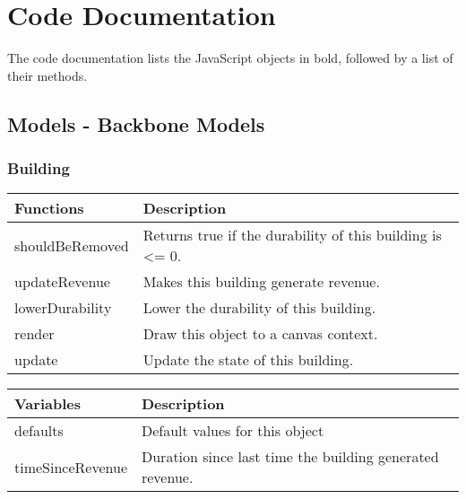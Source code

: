 \chapter{Code Documentation}

The code documentation lists the JavaScript objects in bold, followed by a list of their methods.

\clearpage 

\section{Models - Backbone Models}

\subsection*{Building}
	\begin{table}[H]
	\begin{tabular}{p{4cm} | p{8cm} }
	\hline
	\rowcolor{gray}
	Functions & Description \\ \hline
	shouldBeRemoved & Returns true if the durability of this building is <= 0. \\ \hline
	updateRevenue & Makes this building generate revenue. \\ \hline
	lowerDurability & Lower the durability of this building. \\ \hline
	render & Draw this object to a canvas context. \\ \hline
	update & Update the state of this building. \\ \hline
	\end{tabular}
	\end{table}

	\begin{table}[H]
	\begin{tabular}{p{4cm} | p{8cm} }
	\hline
	\rowcolor{gray}
	Variables & Description \\ \hline
	defaults & Default values for this object \\ \hline
	timeSinceRevenue & Duration since last time the building generated revenue. \\ \hline

	\end{tabular}
	\end{table}

